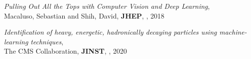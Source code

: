 \documentclass[12pt]{article}
\begin{document}
\begin{flushleft}
\begin{thebibliography}{1}
  \textit{Pulling Out All the Tops with Computer Vision and Deep Learning},\\
 Macaluso, Sebastian and Shih, David, \textbf{JHEP}, , 2018


  \textit{Identification of heavy, energetic, hadronically decaying particles using machine-learning techniques},\\
 The CMS Collaboration, \textbf{JINST}, , 2020

\end{thebibliography}
\end{flushleft}


%
%
\end{document}
